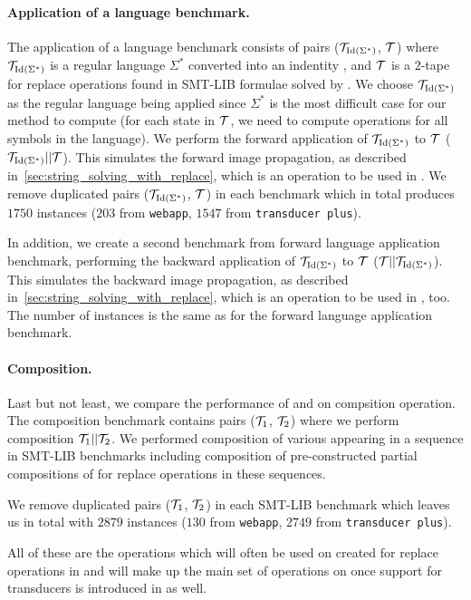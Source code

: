 \paragraph{Application of a language benchmark.}
The application of a language benchmark consists of pairs ($\mathcal{T}_{\text{Id}(\Sigma^*)}$, $\mathcal{T}$) where $\mathcal{T}_{\text{Id}(\Sigma^*)}$ is a regular language $\Sigma^*$ converted into an indentity \nft, and $\mathcal{T}$ is a $2$-tape \nft for replace operations found in SMT-LIB formulae solved by \noodler.
We choose $\mathcal{T}_{\text{Id}(\Sigma^*)}$ as the regular language being applied since $\Sigma^*$ is the most difficult case for our method to compute (for each state in $\mathcal{T}$, we need to compute operations for all symbols in the language).
We perform the forward application of $\mathcal{T}_{\text{Id}(\Sigma^*)}$ to $\mathcal{T}$ ($\mathcal{T}_{\text{Id}(\Sigma^*)} || \mathcal{T} $).
This simulates the forward image propagation, as described in~\ref{sec:string_solving_with_replace}, which is an operation to be used in \noodler.
We remove duplicated pairs ($\mathcal{T}_{\text{Id}(\Sigma^*)}$, $\mathcal{T}$) in each benchmark which in total produces $1750$ instances ($203$ from \texttt{webapp}, $1547$ from \texttt{transducer plus}).

In addition, we create a second benchmark from forward language application benchmark, performing the backward application of $\mathcal{T}_{\text{Id}(\Sigma^*)}$ to $\mathcal{T}$ ($ \mathcal{T} || \mathcal{T}_{\text{Id}(\Sigma^*)}$).
This simulates the backward image propagation, as described in~\ref{sec:string_solving_with_replace}, which is an operation to be used in \noodler, too.
The number of instances is the same as for the forward language application benchmark.

\paragraph{Composition.}
Last but not least, we compare the performance of \mata and \mona on compsition operation.
The composition benchmark contains pairs ($\mathcal{T}_1$, $\mathcal{T}_2$) where we perform composition $\mathcal{T}_1 || \mathcal{T}_2$.
We performed composition of various \nfts appearing in a sequence in SMT-LIB benchmarks including composition of pre-constructed partial compositions of \nfts for replace operations in these sequences.

We remove duplicated pairs ($\mathcal{T}_1$, $\mathcal{T}_2$) in each SMT-LIB benchmark which leaves us in total with $2879$ instances ($130$ from \texttt{webapp}, $2749$ from \texttt{transducer plus}).


All of these are the operations which will often be used on \nfts created for replace operations in \noodler and will make up the main set of operations on \nfts once support for transducers is introduced in \noodler as well.

